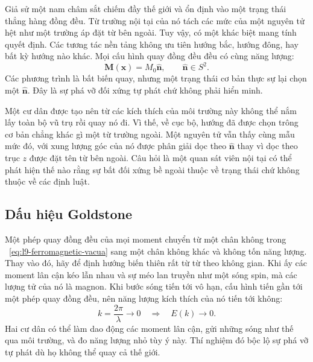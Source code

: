 Giả sử một nam châm sắt chiếm đầy thế giới và ổn định vào một trạng thái thẳng hàng đồng đều. Từ trường nội tại của nó tách các mức của một nguyên tử hệt như một trường áp đặt từ bên ngoài. Tuy vậy, có một khác biệt mang tính quyết định. Các tương tác nền tảng không ưu tiên hướng bắc, hướng đông, hay bất kỳ hướng nào khác. Mọi cấu hình quay đồng đều đều có cùng năng lượng:
\begin{equation}
\mathbf M(\mathbf x)=M_0\hat{\mathbf n},
\qquad
\hat{\mathbf n}\in S^2.
\label{eq:l9-ferromagnetic-vacua}
\end{equation}
Các phương trình là bất biến quay, nhưng một trạng thái cơ bản thực sự lại chọn một \(\hat{\mathbf n}\). Đây là sự phá vỡ đối xứng tự phát chứ không phải hiển minh.

Một cư dân được tạo nên từ các kích thích của môi trường này không thể nắm lấy toàn bộ vũ trụ rồi quay nó đi. Vì thế, về cục bộ, hướng đã được chọn trông cơ bản chẳng khác gì một từ trường ngoài. Một nguyên tử vẫn thấy cùng mẫu mức đó, với xung lượng góc của nó được phân giải dọc theo \(\hat{\mathbf n}\) thay vì dọc theo trục \(z\) được đặt tên từ bên ngoài. Câu hỏi là một quan sát viên nội tại có thể phát hiện thế nào rằng sự bất đối xứng bề ngoài thuộc về trạng thái chứ không thuộc về các định luật.

\subsection{Dấu hiệu Goldstone}

Một phép quay đồng đều của mọi moment chuyển từ một chân không trong ~\eqref{eq:l9-ferromagnetic-vacua} sang một chân không khác và không tốn năng lượng. Thay vào đó, hãy để định hướng biến thiên rất từ từ theo không gian. Khi ấy các moment lân cận kéo lẫn nhau và sự méo lan truyền như một sóng spin, mà các lượng tử của nó là magnon. Khi bước sóng tiến tới vô hạn, cấu hình tiến gần tới một phép quay đồng đều, nên năng lượng kích thích của nó tiến tới không:
\begin{equation}
k=\frac{2\pi}{\lambda}\longrightarrow0
\quad\Longrightarrow\quad
E(k)\longrightarrow0.
\label{eq:l9-gapless-magnon}
\end{equation}
Hai cư dân có thể làm dao động các moment lân cận, gửi những sóng như thế qua môi trường, và đo năng lượng nhỏ tùy ý này. Thí nghiệm đó bộc lộ sự phá vỡ tự phát dù họ không thể quay cả thế giới.


